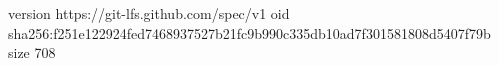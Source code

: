 version https://git-lfs.github.com/spec/v1
oid sha256:f251e122924fed7468937527b21fc9b990c335db10ad7f301581808d5407f79b
size 708

